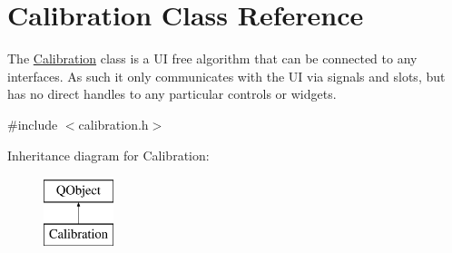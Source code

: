\hypertarget{class_calibration}{\section{Calibration Class Reference}
\label{class_calibration}
}


The \hyperlink{class_calibration}{Calibration} class is a U\-I free algorithm that can be connected to any interfaces. As such it only communicates with the U\-I via signals and slots, but has no direct handles to any particular controls or widgets.  




{\ttfamily \#include $<$calibration.\-h$>$}

Inheritance diagram for Calibration\-:\begin{figure}[H]
\begin{center}
\leavevmode
\includegraphics[height=2.000000cm]{class_calibration}
\end{center}
\end{figure}
